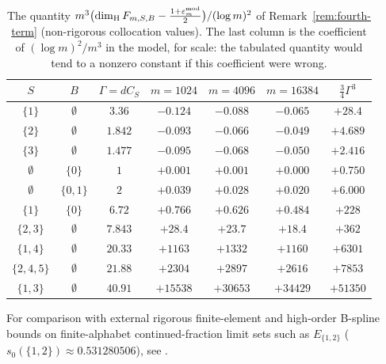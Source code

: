 \begin{table}[ht]
\centering\small\setlength{\tabcolsep}{4pt}
\begin{tabular}{c|c|c|ccc|c}
$S$ & $B$ & $\Gamma=dC_S$ & $m=1024$ & $m=4096$ & $m=16384$ & $\frac34\Gamma^3$ \\\hline
$\{1\}$ & $\emptyset$ & $3.36$ & $-0.124$ & $-0.088$ & $-0.065$ & $+28.4$ \\
$\{2\}$ & $\emptyset$ & $1.842$ & $-0.093$ & $-0.066$ & $-0.049$ & $+4.689$ \\
$\{3\}$ & $\emptyset$ & $1.477$ & $-0.095$ & $-0.068$ & $-0.050$ & $+2.416$ \\
$\emptyset$ & $\{0\}$ & $1$ & $+0.001$ & $+0.001$ & $+0.000$ & $+0.750$ \\
$\emptyset$ & $\{0,1\}$ & $2$ & $+0.039$ & $+0.028$ & $+0.020$ & $+6.000$ \\
$\{1\}$ & $\{0\}$ & $6.72$ & $+0.766$ & $+0.626$ & $+0.484$ & $+228$ \\
$\{2,3\}$ & $\emptyset$ & $7.843$ & $+28.4$ & $+23.7$ & $+18.4$ & $+362$ \\
$\{1,4\}$ & $\emptyset$ & $20.33$ & $+1163$ & $+1332$ & $+1160$ & $+6301$ \\
$\{2,4,5\}$ & $\emptyset$ & $21.88$ & $+2304$ & $+2897$ & $+2616$ & $+7853$ \\
$\{1,3\}$ & $\emptyset$ & $40.91$ & $+15538$ & $+30653$ & $+34429$ & $+51350$ \\
\end{tabular}
\caption{The quantity $m^3\bigl(\dim_{\mathrm{H}} F_{m,S,B}-\frac{1+\varepsilon_m^{\mathrm{mod}}}{2}\bigr)/(\log m)^2$
of Remark~\ref{rem:fourth-term} (non-rigorous collocation values). The last column is the
coefficient of $(\log m)^2/m^3$ in the model, for scale: the tabulated quantity would tend to a
nonzero constant if this coefficient were wrong.}\label{tab:fourth-term}
\end{table}

For comparison with external rigorous finite-element and high-order B-spline bounds on
finite-alphabet continued-fraction limit sets such as $E_{\{1,2\}}$
($s_0(\{1,2\})\approx0.531280506$), see \cite{CLUW2024,CLN2026,Brown2026}.


